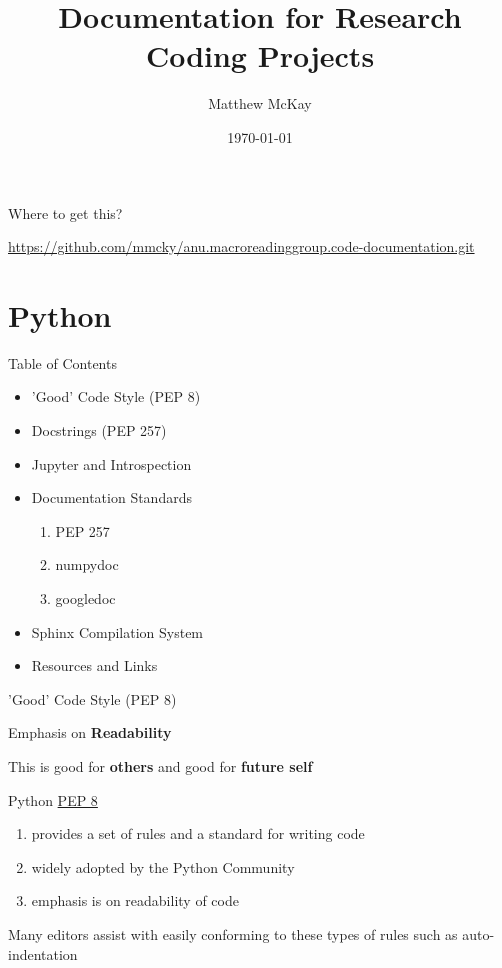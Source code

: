 \documentclass{beamer}
\title{Documentation for Research Coding Projects}
\date{\today}
\author{Matthew McKay}
\institute{QuantEcon - Research School of Economics, ANU, Australia}
\begin{document}
\maketitle

\begin{frame}{Where to get this?}

\url{https://github.com/mmcky/anu.macroreadinggroup.code-documentation.git}

\end{frame}

\section{Python}

\begin{frame}{Table of Contents}
\begin{itemize}
    \item 'Good' Code Style (PEP 8)
    \item Docstrings (PEP 257)
    \item Jupyter and Introspection
    \item Documentation Standards
        \begin{enumerate}
            \item PEP 257
            \item numpydoc
            \item googledoc
        \end{enumerate}
    \item Sphinx Compilation System
    \item Resources and Links
\end{itemize}    
\end{frame}

\begin{frame}{'Good' Code Style (PEP 8)}

Emphasis on \textbf{Readability}

This is good for \textbf{others} and good for \textbf{future self}

Python \href{https://www.python.org/dev/peps/pep-0008/}{PEP 8}

\begin{enumerate}
\item provides a set of rules and a standard for writing code
\item widely adopted by the Python Community
\item emphasis is on readability of code
\end{enumerate}

Many editors assist with easily conforming to these types of rules such as auto-indentation

\end{frame}
\end{document}
